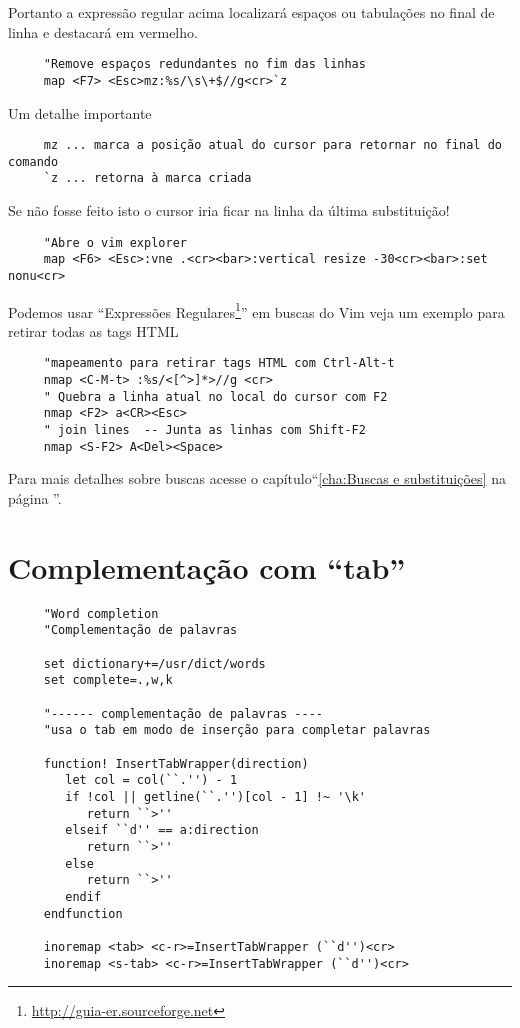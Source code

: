 Portanto a expressão regular acima localizará espaços ou tabulações no final de linha
e destacará em vermelho.


\begin{verbatim}
     "Remove espaços redundantes no fim das linhas
     map <F7> <Esc>mz:%s/\s\+$//g<cr>`z
\end{verbatim}

Um detalhe importante

\begin{verbatim}
     mz ... marca a posição atual do cursor para retornar no final do comando
     `z ... retorna à marca criada
\end{verbatim}

Se não fosse feito isto o cursor iria ficar na linha da última substituição!

\begin{verbatim}
     "Abre o vim explorer
     map <F6> <Esc>:vne .<cr><bar>:vertical resize -30<cr><bar>:set nonu<cr>
\end{verbatim}

Podemos usar ``Expressões Regulares\footnote{\url{http://guia-er.sourceforge.net}}'' em
buscas do Vim veja um exemplo para retirar todas as tags HTML

\begin{verbatim}
     "mapeamento para retirar tags HTML com Ctrl-Alt-t
     nmap <C-M-t> :%s/<[^>]*>//g <cr>
     " Quebra a linha atual no local do cursor com F2
     nmap <F2> a<CR><Esc>
     " join lines  -- Junta as linhas com Shift-F2
     nmap <S-F2> A<Del><Space>
\end{verbatim}

Para mais detalhes sobre buscas acesse o capítulo``\ref{cha:Buscas e substituições}
na página \pageref{cha:Buscas e substituições}''.

\section{Complementação com ``tab''}\label{Complementação com ``tab''}

\begin{verbatim}
     "Word completion
     "Complementação de palavras
     
     set dictionary+=/usr/dict/words
     set complete=.,w,k
     
     "------ complementação de palavras ----
     "usa o tab em modo de inserção para completar palavras
     
     function! InsertTabWrapper(direction)
        let col = col(``.'') - 1
        if !col || getline(``.'')[col - 1] !~ '\k'
           return ``>''
        elseif ``d'' == a:direction
           return ``>''
        else
           return ``>''
        endif
     endfunction
     
     inoremap <tab> <c-r>=InsertTabWrapper (``d'')<cr>
     inoremap <s-tab> <c-r>=InsertTabWrapper (``d'')<cr>
\end{verbatim}

